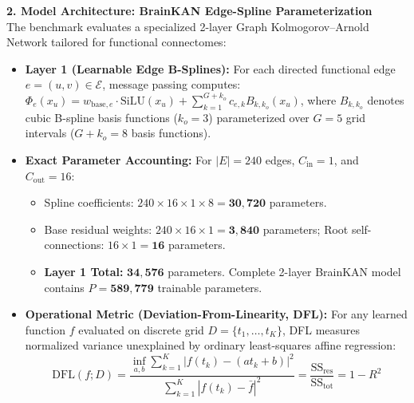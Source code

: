 \documentclass[9pt]{article}
\begin{document}
\textbf{\large 2. Model Architecture: BrainKAN Edge-Spline Parameterization}\\[1pt]
The benchmark evaluates a specialized 2-layer Graph Kolmogorov--Arnold Network tailored for functional connectomes:
\begin{itemize}\itemsep -2.5pt
    \item \textbf{Layer 1 (Learnable Edge B-Splines):} For each directed functional edge $e = (u, v) \in \mathcal{E}$, message passing computes:
    $\Phi_e(x_u) = w_{\mathrm{base}, e} \cdot \mathrm{SiLU}(x_u) + \sum_{k=1}^{G+k_o} c_{e, k} B_{k, k_o}(x_u)$,
    where $B_{k, k_o}$ denotes cubic B-spline basis functions ($k_o = 3$) parameterized over $G = 5$ grid intervals ($G+k_o = 8$ basis functions).
    \item \textbf{Exact Parameter Accounting:} For $|E| = 240$ edges, $C_{\mathrm{in}} = 1$, and $C_{\mathrm{out}} = 16$:
    \begin{itemize}\itemsep -2pt
        \item Spline coefficients: $240 \times 16 \times 1 \times 8 = \mathbf{30,720}$ parameters.
        \item Base residual weights: $240 \times 16 \times 1 = \mathbf{3,840}$ parameters; Root self-connections: $16 \times 1 = \mathbf{16}$ parameters.
        \item \textbf{Layer 1 Total:} $\mathbf{34,576}$ parameters. Complete 2-layer BrainKAN model contains $P = \mathbf{589,779}$ trainable parameters.
    \end{itemize}
    \item \textbf{Operational Metric (Deviation-From-Linearity, DFL):} For any learned function $f$ evaluated on discrete grid $D = \{t_1, \dots, t_K\}$, DFL measures normalized variance unexplained by ordinary least-squares affine regression:
    \begin{equation*}
        \mathrm{DFL}(f; D) = \frac{\inf_{a, b} \sum_{k=1}^K |f(t_k) - (at_k + b)|^2}{\sum_{k=1}^K |f(t_k) - \bar{f}|^2} = \frac{\mathrm{SS}_{\mathrm{res}}}{\mathrm{SS}_{\mathrm{tot}}} = 1 - R^2
    \end{equation*}
\end{itemize}
\end{document}
